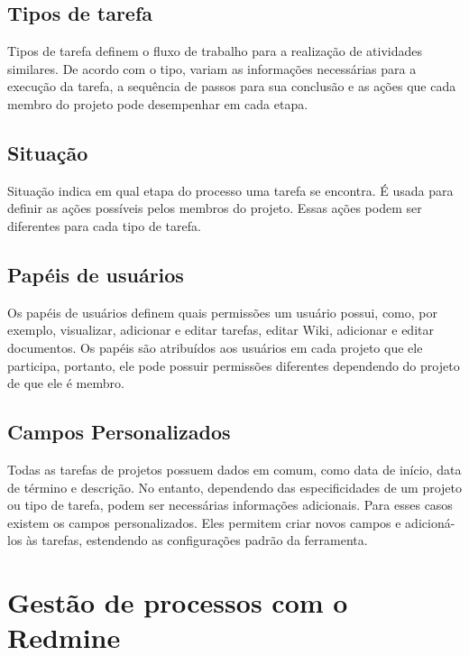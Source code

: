 \subsection{Tipos de tarefa}\label{subsection:redmine-estrutura_basica-tracker}

Tipos de tarefa definem o fluxo de trabalho para a realização de atividades similares. De acordo com o tipo, variam as informações necessárias para a execução da tarefa, a sequência de passos para sua conclusão e as ações que cada membro do projeto pode desempenhar em cada etapa.

\subsection{Situação}\label{subsection:redmine-estrutura_basica-status}

Situação indica em qual etapa do processo uma tarefa se encontra. É usada para definir as ações possíveis pelos membros do projeto. Essas ações podem ser diferentes para cada tipo de tarefa.

\subsection{Papéis de usuários}\label{subsection:redmine-estrutura_basica-role}

Os papéis de usuários definem quais permissões um usuário possui, como, por exemplo, visualizar, adicionar e editar tarefas, editar Wiki, adicionar e editar documentos. Os papéis são atribuídos aos usuários em cada projeto que ele participa, portanto, ele pode possuir permissões diferentes dependendo do projeto de que ele é membro.

\subsection{Campos Personalizados}\label{subsection:redmine-estrutura_basica-custom_fields}

Todas as tarefas de projetos possuem dados em comum, como data de início, data de término e descrição. No entanto, dependendo das especificidades de um projeto ou tipo de tarefa, podem ser necessárias informações adicionais. Para esses casos existem os campos personalizados. Eles permitem criar novos campos e adicioná-los às tarefas, estendendo as configurações padrão da ferramenta.

\section{Gestão de processos com o Redmine}\label{sec:redmine-gestao_processos}

